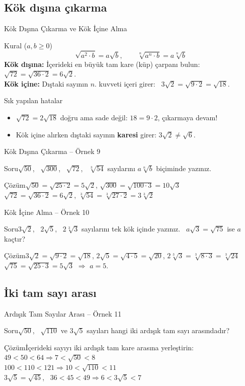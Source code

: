 \documentclass[aspectratio=169,11pt,handout]{beamer}
\newcommand{\soru}[3]{%
\begin{frame}{#1}
  \begin{block}{Soru}\large #2\end{block}
  \pause
  \begin{exampleblock}{Çözüm}\large #3\end{exampleblock}
\end{frame}}
\begin{document}
\subsection{Kök dışına çıkarma}
\begin{frame}{Kök Dışına Çıkarma ve Kök İçine Alma}
\begin{block}{Kural (\(a,b\ge 0\))}
\[\sqrt{a^2\cdot b}=a\sqrt{b},\qquad \sqrt[n]{a^n\cdot b}=a\sqrt[n]{b}\]
\textbf{Kök dışına:} İçerideki en büyük tam kare (küp) çarpanı bulun: \ \(\sqrt{72}=\sqrt{36\cdot 2}=6\sqrt2\).\\[3pt]
\textbf{Kök içine:} Dıştaki sayının \(n\). kuvveti içeri girer: \ \(3\sqrt2=\sqrt{9\cdot 2}=\sqrt{18}\).
\end{block}
\begin{alertblock}{Sık yapılan hatalar}
\begin{itemize}
\item \(\sqrt{72}=2\sqrt{18}\) doğru ama sade değil: \(18=9\cdot 2\), çıkarmaya devam!
\item Kök içine alırken dıştaki sayının \textbf{karesi} girer: \(3\sqrt2\neq\sqrt6\).
\end{itemize}
\end{alertblock}
\end{frame}

\soru{Kök Dışına Çıkarma -- Örnek 9}
{\(\sqrt{50}\), \ \(\sqrt{300}\), \ \(\sqrt{72}\), \ \(\sqrt[3]{54}\) sayılarını \(a\sqrt[n]{b}\) biçiminde yazınız.}
{\(\sqrt{50}=\sqrt{25\cdot 2}=5\sqrt2\), \qquad \(\sqrt{300}=\sqrt{100\cdot 3}=10\sqrt3\)\\[4pt]
\(\sqrt{72}=\sqrt{36\cdot 2}=6\sqrt2\), \qquad \(\sqrt[3]{54}=\sqrt[3]{27\cdot 2}=3\sqrt[3]{2}\)}

\soru{Kök İçine Alma -- Örnek 10}
{\(3\sqrt2\), \ \(2\sqrt5\), \ \(2\sqrt[3]{3}\) sayılarını tek kök içinde yazınız. \ \(a\sqrt3=\sqrt{75}\) ise \(a\) kaçtır?}
{\(3\sqrt2=\sqrt{9\cdot 2}=\sqrt{18}\), \quad \(2\sqrt5=\sqrt{4\cdot 5}=\sqrt{20}\), \quad \(2\sqrt[3]{3}=\sqrt[3]{8\cdot 3}=\sqrt[3]{24}\)\\[4pt]
\(\sqrt{75}=\sqrt{25\cdot 3}=5\sqrt3\) \(\Rightarrow\) \(a=5\).}

\subsection{İki tam sayı arası}
\soru{Ardışık Tam Sayılar Arası -- Örnek 11}
{\(\sqrt{50}\), \ \(\sqrt{110}\) ve \(3\sqrt5\) sayıları hangi iki ardışık tam sayı arasındadır?}
{İçerideki sayıyı iki ardışık tam kare arasına yerleştirin:\\[3pt]
\(49<50<64\Rightarrow 7<\sqrt{50}<8\)\\[3pt]
\(100<110<121\Rightarrow 10<\sqrt{110}<11\)\\[3pt]
\(3\sqrt5=\sqrt{45}\), \ \(36<45<49\Rightarrow 6<3\sqrt5<7\)}
\end{document}
